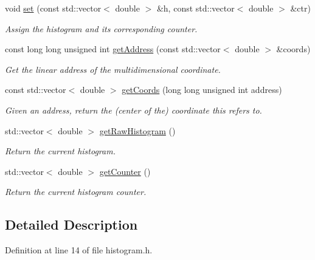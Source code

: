 \begin{DoxyCompactItemize}
void \hyperlink{classhistogram_aab27615593d020ca4de29c586c92af37}{set} (const std\-::vector$<$ double $>$ \&h, const std\-::vector$<$ double $>$ \&ctr)
\begin{DoxyCompactList}\small\item\em Assign the histogram and its corresponding counter. \end{DoxyCompactList}\item 
const long long unsigned int \hyperlink{classhistogram_ae52fa58934b56e05846a66e43c3184bd}{get\-Address} (const std\-::vector$<$ double $>$ \&coords)
\begin{DoxyCompactList}\small\item\em Get the linear address of the multidimensional coordinate. \end{DoxyCompactList}\item 
const std\-::vector$<$ double $>$ \hyperlink{classhistogram_a51aaf60b509809204f21934a18005b38}{get\-Coords} (long long unsigned int address)
\begin{DoxyCompactList}\small\item\em Given an address, return the (center of the) coordinate this refers to. \end{DoxyCompactList}\item 
std\-::vector$<$ double $>$ \hyperlink{classhistogram_a3a75adbce72057f3a4db805d9efc3c9c}{get\-Raw\-Histogram} ()
\begin{DoxyCompactList}\small\item\em Return the current histogram. \end{DoxyCompactList}\item 
std\-::vector$<$ double $>$ \hyperlink{classhistogram_a8417c827c4653055b370786916c901cf}{get\-Counter} ()
\begin{DoxyCompactList}\small\item\em Return the current histogram counter. \end{DoxyCompactList}\end{DoxyCompactItemize}


\subsection{Detailed Description}


Definition at line 14 of file histogram.\-h.



